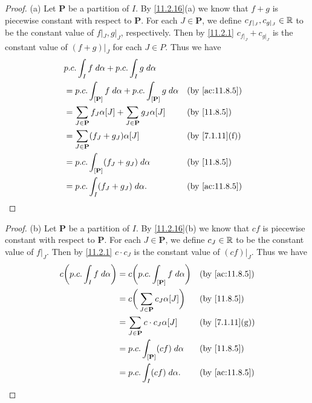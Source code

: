 \begin{proof}{(a)}
  Let \(\mathbf{P}\) be a partition of \(I\).
  By \cref{11.2.16}(a) we know that \(f + g\) is piecewise constant with respect to \(\mathbf{P}\).
  For each \(J \in \mathbf{P}\), we define \(c_{f|_J}, c_{g|_J} \in \mathbb{R}\) to be the constant value of \(f|_J, g|_J\), respectively.
  Then by \cref{11.2.1} \(c_{f|_J} + c_{g|_J}\) is the constant value of \((f + g)|_J\) for each \(J \in P\).
  Thus we have
  \begin{align*}
     & p.c. \int_I f \; d \alpha + p.c. \int_I g \; d \alpha                                                               \\
     & = p.c. \int_{[\mathbf{P}]} f \; d \alpha + p.c. \int_{[\mathbf{P}]} g \; d \alpha &  & \text{(by \cref{ac:11.8.5})} \\
     & = \sum_{J \in \mathbf{P}} f_J \alpha[J] + \sum_{J \in \mathbf{P}} g_J \alpha[J]   &  & \text{(by \cref{11.8.5})}    \\
     & = \sum_{J \in \mathbf{P}} (f_J + g_J) \alpha[J]                                   &  & \text{(by \cref{7.1.11}(f))} \\
     & = p.c. \int_{[\mathbf{P}]} (f_J + g_J) \; d \alpha                                &  & \text{(by \cref{11.8.5})}    \\
     & = p.c. \int_I (f_J + g_J) \; d \alpha.                                            &  & \text{(by \cref{ac:11.8.5})}
  \end{align*}
\end{proof}

\begin{proof}{(b)}
  Let \(\mathbf{P}\) be a partition of \(I\).
  By \cref{11.2.16}(b) we know that \(cf\) is piecewise constant with respect to \(\mathbf{P}\).
  For each \(J \in \mathbf{P}\), we define \(c_J \in \mathbb{R}\) to be the constant value of \(f|_J\).
  Then by \cref{11.2.1} \(c \cdot c_J\) is the constant value of \((cf)|_J\).
  Thus we have
  \begin{align*}
    c \bigg(p.c. \int_I f \; d \alpha\bigg) & = c \bigg(p.c. \int_{[\mathbf{P}]} f \; d \alpha\bigg) &  & \text{(by \cref{ac:11.8.5})} \\
                                            & = c \bigg(\sum_{J \in \mathbf{P}} c_J \alpha[J]\bigg)  &  & \text{(by \cref{11.8.5})}    \\
                                            & = \sum_{J \in \mathbf{P}} c \cdot c_J \alpha[J]        &  & \text{(by \cref{7.1.11}(g))} \\
                                            & = p.c. \int_{[\mathbf{P}]} (c f) \; d \alpha           &  & \text{(by \cref{11.8.5})}    \\
                                            & = p.c. \int_I (c f) \; d \alpha.                       &  & \text{(by \cref{ac:11.8.5})}
  \end{align*}
\end{proof}

